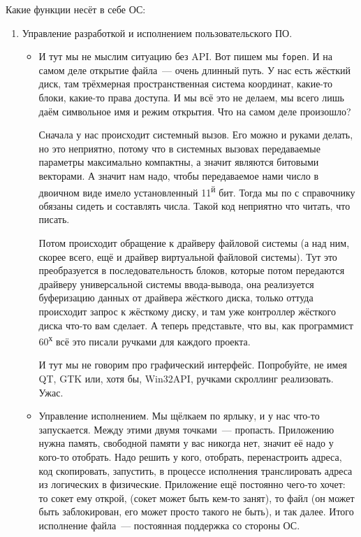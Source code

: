 \documentclass{article}
\begin{document}
    Какие функции несёт в себе ОС:
    \begin{enumerate}
        \item Управление разработкой и исполнением пользовательского ПО.
        \begin{itemize}
            \item И тут мы не мыслим ситуацию без API. Вот пишем мы \texttt{fopen}. И на самом деле открытие файла~--- очень длинный путь. У нас есть жёсткий диск, там трёхмерная пространственная система координат, какие-то блоки, какие-то права доступа. И мы всё это не делаем, мы всего лишь даём символьное имя и режим открытия. Что на самом деле произошло?
            
            Сначала у нас происходит системный вызов. Его можно и руками делать, но это неприятно, потому что в системных вызовах передаваемые параметры максимально компактны, а значит являются битовыми векторами. А значит нам надо, чтобы передаваемое нами число в двоичном виде имело установленный 11\textsuperscript{й} бит. Тогда мы по с справочнику обязаны сидеть и составлять числа. Такой код неприятно что читать, что писать.
            
            Потом происходит обращение к драйверу файловой системы (а над ним, скорее всего, ещё и драйвер виртуальной файловой системы). Тут это преобразуется в последовательность блоков, которые потом передаются драйверу универсальной системы ввода-вывода, она реализуется буферизацию данных от драйвера жёсткого диска, только оттуда происходит запрос к жёсткому диску, и там уже контроллер жёсткого диска что-то вам сделает. А теперь представьте, что вы, как программист 60\textsuperscript{х} всё это писали ручками для каждого проекта.
            
            И тут мы не говорим про графический интерфейс. Попробуйте, не имея QT, GTK или, хотя бы, Win32API, ручками скроллинг реализовать. Ужас.

            \item Управление исполнением. Мы щёлкаем по ярлыку, и у нас что-то запускается. Между этими двумя точками~--- пропасть. Приложению нужна память, свободной памяти у вас никогда нет, значит её надо у кого-то отобрать. Надо решить у кого, отобрать, перенастроить адреса, код скопировать, запустить, в процессе исполнения транслировать адреса из логических в физические. Приложение ещё постоянно чего-то хочет: то сокет ему открой, (сокет может быть кем-то занят), то файл (он может быть заблокирован, его может просто такого не быть), и так далее. Итого исполнение файла~--- постоянная поддержка со стороны ОС.
            

\end{itemize}
\end{enumerate}
\end{document}
